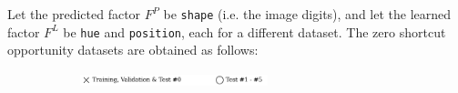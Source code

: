\begin{dataset}
\begin{figure}[H]
\begin{subfigure}[b]{0.45\textwidth}
\begin{subfigure}[b]{0.48\textwidth}
            \end{subfigure}
        \end{subfigure}
    \end{figure}
\end{dataset}


\begin{dataset}\label{def:zso_experiments}
    Let the predicted factor $F^P$ be \texttt{shape} (i.e. the image digits), and let the 
    learned factor $F^L$ be \texttt{hue} and \texttt{position}, each for a different dataset. The 
    zero shortcut opportunity datasets are obtained as follows:

    \begin{figure}[H]
        \centering
        \begin{subfigure}[b]{\textwidth}
            \centering
            \includegraphics[width=0.6\textwidth]{img/datasets/_legend.pdf}
        \end{subfigure}
        \vspace{-0.2cm} %


\end{figure}
\end{dataset}
